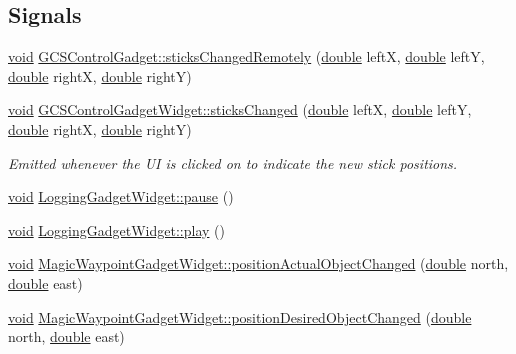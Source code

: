 \subsection*{Signals}
\begin{DoxyCompactItemize}
\item 
\hyperlink{group___u_a_v_objects_plugin_ga444cf2ff3f0ecbe028adce838d373f5c}{void} \hyperlink{group___g_c_s_control_gadget_plugin_gadf32420d5e7ad8ff1d32752209406e28}{G\-C\-S\-Control\-Gadget\-::sticks\-Changed\-Remotely} (\hyperlink{_super_l_u_support_8h_a8956b2b9f49bf918deed98379d159ca7}{double} left\-X, \hyperlink{_super_l_u_support_8h_a8956b2b9f49bf918deed98379d159ca7}{double} left\-Y, \hyperlink{_super_l_u_support_8h_a8956b2b9f49bf918deed98379d159ca7}{double} right\-X, \hyperlink{_super_l_u_support_8h_a8956b2b9f49bf918deed98379d159ca7}{double} right\-Y)
\item 
\hyperlink{group___u_a_v_objects_plugin_ga444cf2ff3f0ecbe028adce838d373f5c}{void} \hyperlink{group___g_c_s_control_gadget_plugin_gacad03ad4b99da2390b6a712a475b4987}{G\-C\-S\-Control\-Gadget\-Widget\-::sticks\-Changed} (\hyperlink{_super_l_u_support_8h_a8956b2b9f49bf918deed98379d159ca7}{double} left\-X, \hyperlink{_super_l_u_support_8h_a8956b2b9f49bf918deed98379d159ca7}{double} left\-Y, \hyperlink{_super_l_u_support_8h_a8956b2b9f49bf918deed98379d159ca7}{double} right\-X, \hyperlink{_super_l_u_support_8h_a8956b2b9f49bf918deed98379d159ca7}{double} right\-Y)
\begin{DoxyCompactList}\small\item\em Emitted whenever the U\-I is clicked on to indicate the new stick positions. \end{DoxyCompactList}\item 
\hyperlink{group___u_a_v_objects_plugin_ga444cf2ff3f0ecbe028adce838d373f5c}{void} \hyperlink{group___g_c_s_control_gadget_plugin_gab36252efc1545bad1c46720b2fd92a22}{Logging\-Gadget\-Widget\-::pause} ()
\item 
\hyperlink{group___u_a_v_objects_plugin_ga444cf2ff3f0ecbe028adce838d373f5c}{void} \hyperlink{group___g_c_s_control_gadget_plugin_gabd0c6db2a3fecf6afb525d40bc12431c}{Logging\-Gadget\-Widget\-::play} ()
\item 
\hyperlink{group___u_a_v_objects_plugin_ga444cf2ff3f0ecbe028adce838d373f5c}{void} \hyperlink{group___g_c_s_control_gadget_plugin_gabd9554a73e1a5f9370d4aefabc29cc96}{Magic\-Waypoint\-Gadget\-Widget\-::position\-Actual\-Object\-Changed} (\hyperlink{_super_l_u_support_8h_a8956b2b9f49bf918deed98379d159ca7}{double} north, \hyperlink{_super_l_u_support_8h_a8956b2b9f49bf918deed98379d159ca7}{double} east)
\item 
\hyperlink{group___u_a_v_objects_plugin_ga444cf2ff3f0ecbe028adce838d373f5c}{void} \hyperlink{group___g_c_s_control_gadget_plugin_ga923489d0d3e251a031fdc66ce20d411b}{Magic\-Waypoint\-Gadget\-Widget\-::position\-Desired\-Object\-Changed} (\hyperlink{_super_l_u_support_8h_a8956b2b9f49bf918deed98379d159ca7}{double} north, \hyperlink{_super_l_u_support_8h_a8956b2b9f49bf918deed98379d159ca7}{double} east)
\end{DoxyCompactItemize}
